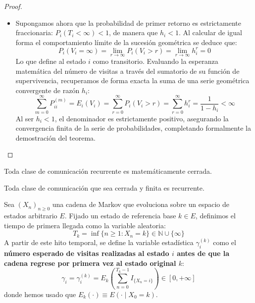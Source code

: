 \documentclass[10pt]{book}
\begin{document}
\begin{teo}
\begin{proof}
\begin{itemize}
        \item[\textbf{Caso ii)}] Supongamos ahora que la probabilidad de primer retorno es estrictamente fraccionaria: $P_i(T_i < \infty) < 1$, de manera que $h_i < 1$. Al calcular de igual forma el comportamiento límite de la sucesión geométrica se deduce que:
        \[ 
        P_i(V_i = \infty) = \lim_{r \to \infty} P_i(V_i > r) = \lim_{r \to \infty} h_i^r = 0 
        \]
        Lo que define al estado $i$ como transitorio. Evaluando la esperanza matemática del número de visitas a través del sumatorio de su función de supervivencia, recuperamos de forma exacta la suma de una serie geométrica convergente de razón $h_i$:
        \[ 
        \sum_{m=0}^{\infty} P_{ii}^{(m)} = E_i(V_i) = \sum_{r=0}^{\infty} P_i(V_i > r) = \sum_{r=0}^{\infty} h_i^r = \frac{1}{1 - h_i} < \infty 
        \]
        Al ser $h_i < 1$, el denominador es estrictamente positivo, asegurando la convergencia finita de la serie de probabilidades, completando formalmente la demostración del teorema.
    \end{itemize}
\end{proof}
\end{teo}

\begin{teo}
    Toda clase de comunicación recurrente es matemáticamente cerrada.
\end{teo}

\begin{teo}
    Toda clase de comunicación que sea cerrada y finita es recurrente.
\end{teo}


\begin{definicion}
    Sea $(X_n)_{n \geq 0}$ una cadena de Markov que evoluciona sobre un espacio de estados arbitrario $E$. Fijado un estado de referencia base $k \in E$, definimos el tiempo de primera llegada como la variable aleatoria:
    \[ 
    T_k = \inf\{n \geq 1 : X_n = k\} \in \mathbb{N} \cup \{\infty\} 
    \]
    A partir de este hito temporal, se define la variable estadística $\gamma_i^{(k)}$ como el \textbf{número esperado de visitas realizadas al estado $i$ antes de que la cadena regrese por primera vez al estado original $k$}:
    \[ 
    \gamma_i = \gamma_i^{(k)} = E_k \left( \sum_{n=0}^{T_k - 1} I_{\{X_n = i\}} \right) \in [0, +\infty] 
    \]
    donde hemos usado que $E_k(\cdot) \equiv E(\cdot \mid X_0 = k) $.
\end{definicion}
\end{document}
